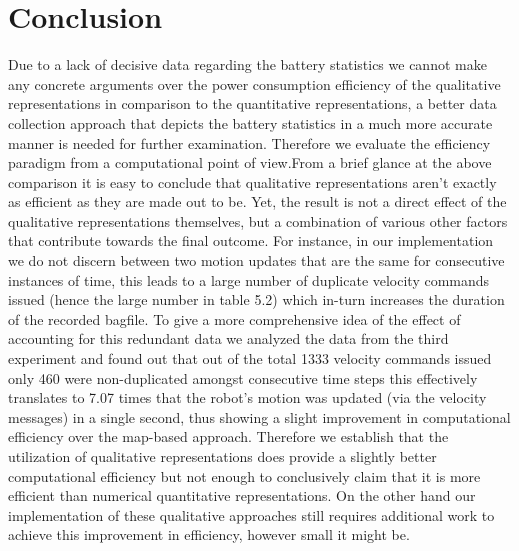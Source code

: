\section{Conclusion}
Due to a lack of decisive data regarding the battery statistics we cannot make any concrete arguments over the power consumption efficiency of the qualitative representations in comparison to the quantitative representations, a better data collection approach that depicts the battery statistics in a much more accurate manner is needed for further examination. Therefore we evaluate the efficiency paradigm from a computational point of view.From a brief glance at the above comparison it is easy to conclude that qualitative representations aren't exactly as efficient as they are made out to be. Yet, the result is not a direct effect of the qualitative representations themselves, but a combination of various other factors that contribute towards the final outcome. For instance, in our implementation we do not discern between two motion updates that are the same for consecutive instances of time, this leads to a large number of duplicate velocity commands issued (hence the large number in table 5.2) which in-turn increases the duration of the recorded bagfile. To give a more comprehensive idea of the effect of accounting for this redundant data we analyzed the data from the third experiment and found out that out of the total 1333 velocity commands issued only 460 were non-duplicated amongst consecutive time steps this effectively translates to 7.07 times that the robot's motion was updated (via the velocity messages) in a single second, thus showing a slight improvement in computational efficiency over the map-based approach. Therefore we establish that the utilization of qualitative representations does provide a slightly better computational efficiency but not enough to conclusively claim that it is more efficient than numerical quantitative representations. On the other hand our implementation of these qualitative approaches still requires additional work to achieve this improvement in efficiency, however small it might be. 

